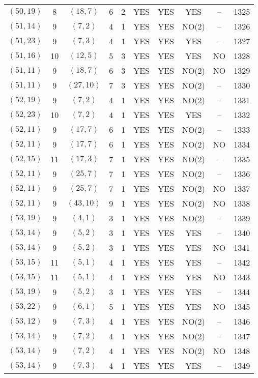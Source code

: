 \begin{longtable}{|c|c|c|c|c|c|c|c|c|c|}
$(50, 19)$ & 8 & $(18, 7)$ & 6 & 2 & YES & YES & YES & -- & 1325\\
$(51, 14)$ & 9 & $(7, 2)$ & 4 & 1 & YES & YES & NO(2) & -- & 1326\\
$(51, 23)$ & 9 & $(7, 3)$ & 4 & 1 & YES & YES & YES & -- & 1327\\
$(51, 16)$ & 10 & $(12, 5)$ & 5 & 3 & YES & YES & YES & NO & 1328\\
$(51, 11)$ & 9 & $(18, 7)$ & 6 & 3 & YES & YES & NO(2) & NO & 1329\\
$(51, 11)$ & 9 & $(27, 10)$ & 7 & 3 & YES & YES & NO(2) & -- & 1330\\
$(52, 19)$ & 9 & $(7, 2)$ & 4 & 1 & YES & YES & NO(2) & -- & 1331\\
$(52, 23)$ & 10 & $(7, 2)$ & 4 & 1 & YES & YES & YES & -- & 1332\\
$(52, 11)$ & 9 & $(17, 7)$ & 6 & 1 & YES & YES & NO(2) & -- & 1333\\
$(52, 11)$ & 9 & $(17, 7)$ & 6 & 1 & YES & YES & NO(2) & NO & 1334\\
$(52, 15)$ & 11 & $(17, 3)$ & 7 & 1 & YES & YES & NO(2) & -- & 1335\\
$(52, 11)$ & 9 & $(25, 7)$ & 7 & 1 & YES & YES & NO(2) & -- & 1336\\
$(52, 11)$ & 9 & $(25, 7)$ & 7 & 1 & YES & YES & NO(2) & NO & 1337\\
$(52, 11)$ & 9 & $(43, 10)$ & 9 & 1 & YES & YES & NO(2) & NO & 1338\\
$(53, 19)$ & 9 & $(4, 1)$ & 3 & 1 & YES & YES & NO(2) & -- & 1339\\
$(53, 14)$ & 9 & $(5, 2)$ & 3 & 1 & YES & YES & YES & -- & 1340\\
$(53, 14)$ & 9 & $(5, 2)$ & 3 & 1 & YES & YES & YES & NO & 1341\\
$(53, 15)$ & 11 & $(5, 1)$ & 4 & 1 & YES & YES & YES & -- & 1342\\
$(53, 15)$ & 11 & $(5, 1)$ & 4 & 1 & YES & YES & YES & NO & 1343\\
$(53, 19)$ & 9 & $(5, 2)$ & 3 & 1 & YES & YES & YES & -- & 1344\\
$(53, 22)$ & 9 & $(6, 1)$ & 5 & 1 & YES & YES & YES & NO & 1345\\
$(53, 12)$ & 9 & $(7, 3)$ & 4 & 1 & YES & YES & NO(2) & -- & 1346\\
$(53, 14)$ & 9 & $(7, 2)$ & 4 & 1 & YES & YES & NO(2) & -- & 1347\\
$(53, 14)$ & 9 & $(7, 2)$ & 4 & 1 & YES & YES & NO(2) & NO & 1348\\
$(53, 14)$ & 9 & $(7, 3)$ & 4 & 1 & YES & YES & YES & -- & 1349\\

\end{longtable}
